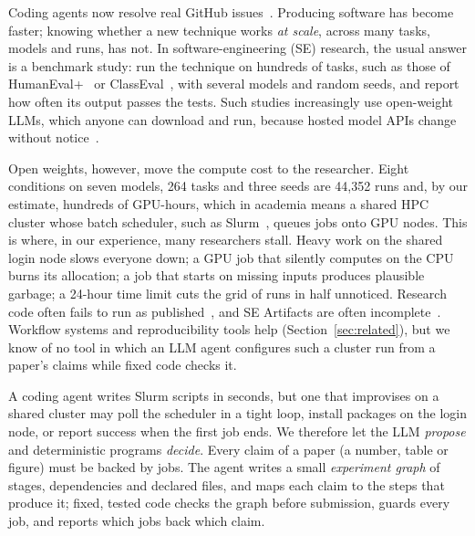 \documentclass[10pt,conference]{IEEEtran}
\begin{document}
Coding agents now resolve real GitHub issues~\cite{jimenez2024swebench,yang2024sweagent}. Producing software has become faster; knowing whether a new technique works \emph{at scale}, across many tasks, models and runs, has not. In software-engineering (SE) research, the usual answer is a benchmark study: run the technique on hundreds of tasks, such as those of HumanEval+~\cite{liu2023evalplus} or ClassEval~\cite{du2024classeval}, with several models and random seeds, and report how often its output passes the tests. Such studies increasingly use open-weight LLMs, which anyone can download and run, because hosted model APIs change without notice~\cite{sallou2024breaking,baltes2025guidelines}.

Open weights, however, move the compute cost to the researcher. Eight conditions on seven models, 264 tasks and three seeds are 44{,}352 runs and, by our estimate, hundreds of GPU-hours, which in academia means a shared HPC cluster whose batch scheduler, such as Slurm~\cite{yoo2003slurm}, queues jobs onto GPU nodes. This is where, in our experience, many researchers stall. Heavy work on the shared login node slows everyone down; a GPU job that silently computes on the CPU burns its allocation; a job that starts on missing inputs produces plausible garbage; a 24-hour time limit cuts the grid of runs in half unnoticed. Research code often fails to run as published~\cite{pimentel2019jupyter,trisovic2022research,collberg2016repeatability}, and SE Artifacts are often incomplete~\cite{timperley2021artifact,liu2024artifacts}. Workflow systems and reproducibility tools help (Section~\ref{sec:related}), but we know of no tool in which an LLM agent configures such a cluster run from a paper's claims while fixed code checks it.

A coding agent writes Slurm scripts in seconds, but one that improvises on a shared cluster may poll the scheduler in a tight loop, install packages on the login node, or report success when the first job ends. We therefore let the LLM \emph{propose} and deterministic programs \emph{decide}. Every claim of a paper (a number, table or figure) must be backed by jobs. The agent writes a small \emph{experiment graph} of stages, dependencies and declared files, and maps each claim to the steps that produce it; fixed, tested code checks the graph before submission, guards every job, and reports which jobs back which claim.
\end{document}
